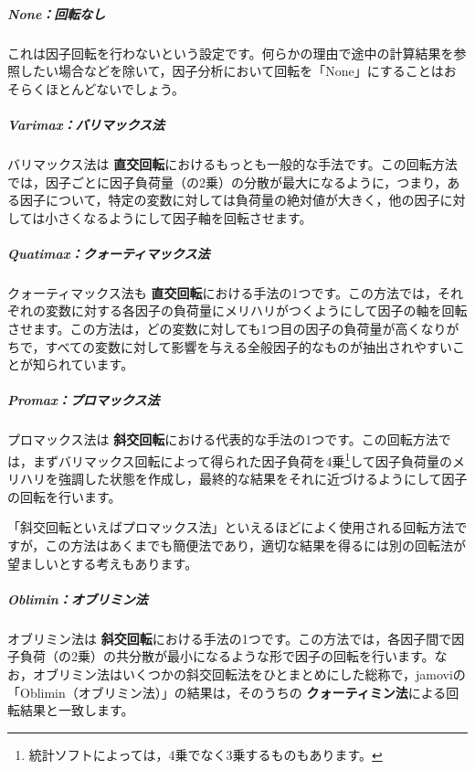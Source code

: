 \documentclass[
  12pt,
  a5jpaper,
  lualatex, ja=standard]{bxjsbook}
\renewcommand{\emph}[1]{\textbf{\color{emph} #1}}
\begin{document}
\hypertarget{fa-efa-rotation-none}{%
\subparagraph*{None：回転なし}\label{fa-efa-rotation-none}}

これは因子回転を行わないという設定です。何らかの理由で途中の計算結果を参照したい場合などを除いて，因子分析において回転を「None」にすることはおそらくほとんどないでしょう。

\hypertarget{fa-efa-rotation-varimax}{%
\subparagraph*{Varimax：バリマックス法}\label{fa-efa-rotation-varimax}}

バリマックス法は\emph{直交回転}におけるもっとも一般的な手法です。この回転方法では，因子ごとに因子負荷量（の2乗）の分散が最大になるように，つまり，ある因子について，特定の変数に対しては負荷量の絶対値が大きく，他の因子に対しては小さくなるようにして因子軸を回転させます。

\hypertarget{fa-efa-rotation-quartimax}{%
\subparagraph*{Quatimax：クォーティマックス法}\label{fa-efa-rotation-quartimax}}

クォーティマックス法も\emph{直交回転}における手法の1つです。この方法では，それぞれの変数に対する各因子の負荷量にメリハリがつくようにして因子の軸を回転させます。この方法は，どの変数に対しても1つ目の因子の負荷量が高くなりがちで，すべての変数に対して影響を与える全般因子的なものが抽出されやすいことが知られています。

\hypertarget{fa-efa-rotation-promax}{%
\subparagraph*{Promax：プロマックス法}\label{fa-efa-rotation-promax}}

プロマックス法は\emph{斜交回転}における代表的な手法の1つです。この回転方法では，まずバリマックス回転によって得られた因子負荷を4乗\footnote{統計ソフトによっては，4乗でなく3乗するものもあります。}して因子負荷量のメリハリを強調した状態を作成し，最終的な結果をそれに近づけるようにして因子の回転を行います。

「斜交回転といえばプロマックス法」といえるほどによく使用される回転方法ですが，この方法はあくまでも簡便法であり，適切な結果を得るには別の回転法が望ましいとする考えもあります。

\hypertarget{fa-efa-rotation-oblimin}{%
\subparagraph*{Oblimin：オブリミン法}\label{fa-efa-rotation-oblimin}}

オブリミン法は\emph{斜交回転}における手法の1つです。この方法では，各因子間で因子負荷（の2乗）の共分散が最小になるような形で因子の回転を行います。なお，オブリミン法はいくつかの斜交回転法をひとまとめにした総称で，jamoviの「Oblimin（オブリミン法）」の結果は，そのうちの\emph{クォーティミン法}による回転結果と一致します。
\end{document}
